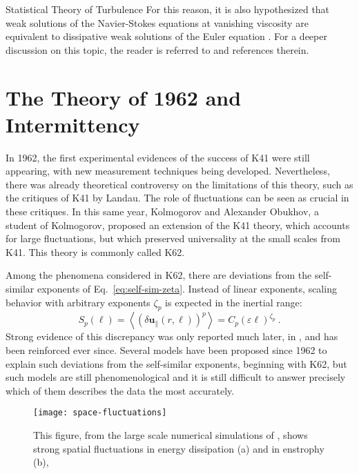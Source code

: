 \begin{chapter}{Statistical Theory of Turbulence}
For this reason, it is also hypothesized that weak solutions
of the Navier-Stokes equations at
vanishing viscosity are equivalent to dissipative weak solutions of the Euler
equation \parencite{eyink2006}.
For
a deeper discussion on this topic, the reader is referred to
\textcite{delellis2019,tao2019onsager} and references therein.

\section{The Theory of 1962 and Intermittency} \label{sec:k62}

In 1962, the first experimental evidences of the success of K41 were
still appearing,
with new measurement techniques being developed.
Nevertheless, there was already theoretical
controversy on the limitations of this theory, such as the critiques
of K41 by Landau. The role of fluctuations
can be seen as crucial in these critiques. In this same year, Kolmogorov
and Alexander Obukhov, a student of Kolmogorov, proposed an extension of the K41 theory,
which accounts for large fluctuations, but which preserved universality at the small
scales from K41.
This theory is commonly called K62.

Among the phenomena considered in K62, there are
deviations from the self-similar exponents of Eq.~\eqref{eq:self-sim-zeta}.
Instead of linear exponents, scaling behavior with arbitrary exponents $\zeta_p$
is expected in the inertial range:
\begin{equation} \label{eq:anomalous-zeta}
    S_p(\ell) = \left\langle\left(\delta \mathbf{u}_{ \|}(r, \ell)\right)^{p} \right\rangle
    = C_p (\varepsilon \ell)^{\zeta_p} \ .
\end{equation}
Strong evidence of this discrepancy was only reported much later,
in \textcite{anselmet1984high}, and has been reinforced ever since.
Several models have been proposed since 1962 to explain such deviations
from the self-similar exponents, beginning with K62,
but such models are still phenomenological and it is still difficult to answer
precisely which of them describes the data the most accurately.

\begin{figure}[h]
    \centering
    \texttt{[image: space-fluctuations]}
    \caption[Fluctuations in energy dissipation and enstrophy]
    {This figure, from the large scale numerical simulations of \textcite{ishihara2009},
    shows
    strong spatial fluctuations in energy dissipation (a) and in enstrophy (b),
    }
    \label{fig:space-fluctuations}
\end{figure}


\end{chapter}
